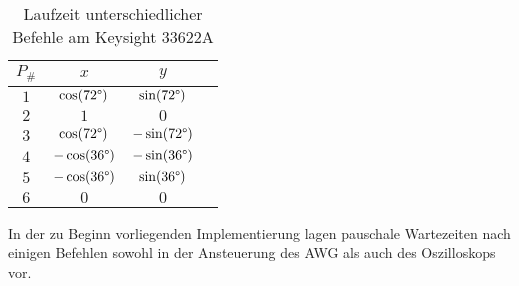 \documentclass[../Report.tex]{subfiles}
\begin{document}
\begin{table} 
\begin{subtable}[t]{.35\linewidth}
\label{ta}
\begin{tabular}[t]{ | c | c | c | c | } 
  \hline
    $P_{\#}$ & $x$ & $y$ \\ 
  \hline
    $1$ & $\cos(72\degree)$ 	& $\sin(72\degree)$ \\ 
  \hline
    $2$ & $1$ 				& $0$ \\
  \hline
    $3$ & $\cos(72\degree)$ 	& $-\sin(72\degree)$ \\
  \hline
    $4$ & $-\cos(36\degree)$ & $-\sin(36\degree)$ \\
  \hline
    $5$ & $-\cos(36\degree)$ & $\sin(36\degree)$ \\
  \hline
    $6$ & $0$ 				& $0$ \\  
  \hline  
\end{tabular}
\end{subtable}
\caption{Laufzeit unterschiedlicher Befehle am Keysight 33622A}
\label{tab:vorg.gerate.runtime}
\end{table}

In der zu Beginn vorliegenden Implementierung lagen pauschale Wartezeiten nach einigen Befehlen sowohl in der Ansteuerung des AWG als auch des Oszilloskops vor. 
\end{document}
